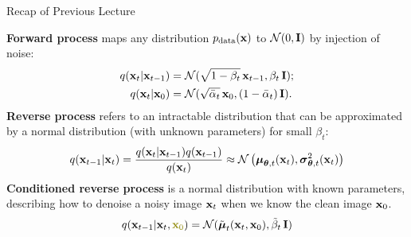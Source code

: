 \documentclass{beamer}
\begin{document}
\begin{frame}{Recap of Previous Lecture}

	\textbf{Forward process} maps any distribution $p_{\text{data}}(\mathbf{x})$ to $\mathcal{N}(0, \mathbf{I})$ by injection of noise:
	\begin{align*}
		q(\mathbf{x}_t | \mathbf{x}_{t-1}) &= \mathcal{N}(\sqrt{1 - \beta_t}\, \mathbf{x}_{t-1}, \beta_t\, \mathbf{I}); \\
		q(\mathbf{x}_t | \mathbf{x}_0) &= \mathcal{N}(\sqrt{\bar{\alpha}_t}\, \mathbf{x}_0, (1 - \bar{\alpha}_t)\, \mathbf{I}).
	\end{align*}
	\textbf{Reverse process} refers to an intractable distribution that can be approximated by a normal distribution (with unknown parameters) for small $\beta_t$:
	\[
		q(\mathbf{x}_{t-1}|\mathbf{x}_{t}) = \frac{q(\mathbf{x}_{t}|\mathbf{x}_{t-1}) q(\mathbf{x}_{t-1})}{q(\mathbf{x}_{t})} \approx \mathcal{N} \left(\boldsymbol{\mu}_{\boldsymbol{\theta}, t}(\mathbf{x}_t), \boldsymbol{\sigma}_{\boldsymbol{\theta}, t}^2(\mathbf{x}_t)\right)
	\]
	\textbf{Conditioned reverse process} is a normal distribution with known parameters, describing how to denoise a noisy image $\mathbf{x}_t$ when we know the clean image $\mathbf{x}_0$.
	\vspace{-0.3cm}
	\[
		q(\bx_{t-1}|\bx_{t}, {\color{olive}\bx_0}) = \cN(\tilde{\bmu}_t(\bx_t, \bx_0), \tilde{\beta}_t\, \bI)
	\]
\end{frame}
\end{document}
